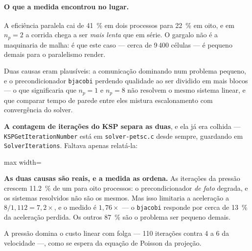 \paragraph{O que a medida encontrou no lugar.} A efici\^encia paralela cai de
\SI{41}{\percent} em dois processos para \SI{22}{\percent} em oito, e em $n_p=2$ a
corrida chega a ser \emph{mais lenta} que em s\'erie. O gargalo n\~ao \'e a
maquinaria de malha: \'e que este caso --- cerca de 9\,400 c\'elulas --- \'e
pequeno demais para o paralelismo render.

Duas causas eram plaus\'iveis: a comunica\c{c}\~ao dominando num problema pequeno,
e o precondicionador \texttt{bjacobi} perdendo qualidade ao ser dividido em mais
blocos --- o que significaria que $n_p=1$ e $n_p=8$ n\~ao resolvem o mesmo sistema
linear, e que comparar tempo de parede entre eles mistura escalonamento com
converg\^encia do solver.

\textbf{A contagem de itera\c{c}\~oes do KSP separa as duas}, e ela j\'a era
colhida --- \texttt{KSPGet\allowbreak{}Iteration\allowbreak{}Number} est\'a em \texttt{solver-petsc.c} desde
sempre, guardando em \texttt{SolverIterations}. Faltava apenas relat\'a-la:

\begin{adjustbox}{max width=\linewidth}
\end{adjustbox}

\textbf{As duas causas s\~ao reais, e a medida as ordena.} As itera\c{c}\~oes da
press\~ao crescem \SI{11.2}{\percent} de um para oito processos: o
precondicionador \emph{de fato} degrada, e os sistemas resolvidos n\~ao s\~ao os
mesmos. Mas isso limitaria a acelera\c{c}\~ao a $8/1{,}112 = 7{,}2\times$, e o
medido \'e $1{,}76\times$ --- o \texttt{bjacobi} responde por cerca de
\SI{13}{\percent} da acelera\c{c}\~ao perdida. Os outros \SI{87}{\percent} s\~ao o
problema ser pequeno demais.

A press\~ao domina o custo linear com folga --- 110 itera\c{c}\~oes contra 4 a 6
da velocidade ---, como se espera da equa\c{c}\~ao de Poisson da proje\c{c}\~ao.

